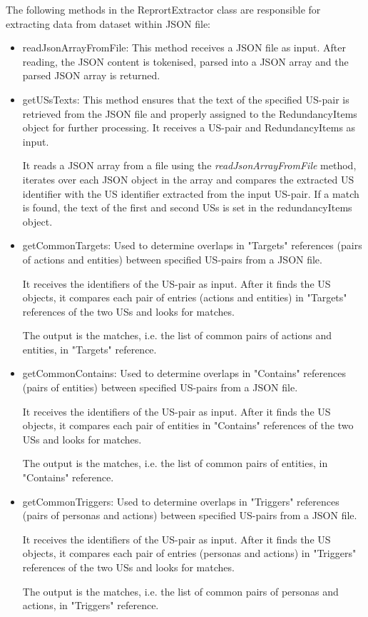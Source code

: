 The following methods in the ReprortExtractor class are responsible for extracting data from dataset within JSON file:
\begin{itemize}
	\item readJsonArrayFromFile: This method receives a JSON file as input. After reading, the JSON content is tokenised, parsed into a JSON array and the parsed JSON array is returned.
	
	\item getUSsTexts: This method ensures that the text of the specified US-pair is retrieved from the JSON file and properly assigned to the RedundancyItems object for further processing. It receives a US-pair and RedundancyItems as input. 
	
	It reads a JSON array from a file using the \textit{readJsonArrayFromFile} method, iterates over each JSON object in the array and compares the extracted US identifier with the US identifier extracted from the input US-pair. If a match is found, the text of the first and second USs is set in the redundancyItems object.
	
	\item getCommonTargets: Used to determine overlaps in "Targets" references (pairs of actions and entities) between specified US-pairs from a JSON file.
	
	It receives the identifiers of the US-pair as input. After it finds the US objects, it compares each pair of entries (actions and entities) in "Targets" references of the two USs and looks for matches.
	
	The output is the matches, i.e. the list of common pairs of actions and entities, in "Targets" reference.
	
	\item getCommonContains: Used to determine overlaps in "Contains" references (pairs of entities) between specified US-pairs from a JSON file.
	
	It receives the identifiers of the US-pair as input. After it finds the US objects, it compares each pair of entities in "Contains" references of the two USs and looks for matches.
	
	The output is the matches, i.e. the list of common pairs of entities, in "Contains" reference.
	
	\item getCommonTriggers: Used to determine overlaps in "Triggers" references (pairs of personas and actions) between specified US-pairs from a JSON file.
	
	It receives the identifiers of the US-pair as input. After it finds the US objects, it compares each pair of entries (personas and actions) in "Triggers" references of the two USs and looks for matches.
	
	The output is the matches, i.e. the list of common pairs of personas and actions, in "Triggers" reference.
\end{itemize}
